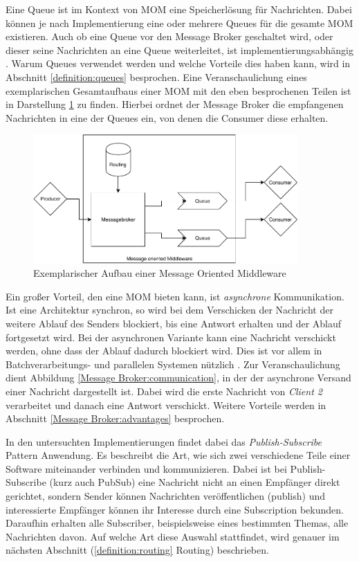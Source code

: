 Eine Queue ist im Kontext von MOM eine Speicherlösung für Nachrichten.
Dabei können je nach Implementierung eine oder mehrere Queues für die gesamte
MOM existieren. Auch ob eine Queue vor den
Message Broker geschaltet wird, oder dieser seine Nachrichten an eine Queue
weiterleitet, ist implementierungsabhängig \cite{KafkaClients:online,RabbitMQ:online}.
Warum Queues verwendet werden und welche Vorteile dies haben kann, wird in
Abschnitt \ref{definition:queues} besprochen.
Eine Veranschaulichung eines exemplarischen Gesamtaufbaus einer MOM mit den
eben besprochenen Teilen ist in Darstellung \ref{definition:momfigure} zu finden.
Hierbei ordnet der Message Broker die empfangenen Nachrichten in eine der Queues
ein, von denen die Consumer diese erhalten.

\begin{figure}[h]
  \centering
    \includegraphics[width=0.9\textwidth]{figures/mom.pdf}
  \caption{Exemplarischer Aufbau einer Message Oriented Middleware}
  \label{definition:momfigure}
\end{figure}

Ein großer Vorteil, den eine MOM bieten kann, ist \textit{asynchrone} Kommunikation.
Ist eine Architektur synchron, so wird bei dem Verschicken der
Nachricht der weitere Ablauf des Senders blockiert, bis eine Antwort erhalten
und der Ablauf fortgesetzt wird. Bei der asynchronen Variante kann eine
Nachricht verschickt werden, ohne dass der Ablauf dadurch blockiert wird.
Dies ist vor allem in Batchverarbeitungs- und parallelen Systemen nützlich \cite{tanenbaum2007distributed}.
Zur Veranschaulichung dient Abbildung \ref{Message Broker:communication}, in
der der asynchrone Versand einer Nachricht dargestellt ist. Dabei wird die erste
Nachricht von \textit{Client 2} verarbeitet und danach eine Antwort verschickt.
Weitere Vorteile werden in Abschnitt \ref{Message Broker:advantages} besprochen.

In den untersuchten Implementierungen findet dabei das \textit{Publish-Subscribe}
Pattern Anwendung. Es beschreibt die Art, wie sich zwei verschiedene Teile einer
Software miteinander verbinden und kommunizieren. Dabei ist bei Publish-Subscribe
(kurz auch PubSub) eine Nachricht nicht an einen Empfänger direkt gerichtet,
sondern Sender können Nachrichten veröffentlichen (publish) und interessierte
Empfänger können ihr Interesse durch eine Subscription bekunden.
Daraufhin erhalten alle Subscriber, beispielsweise eines bestimmten Themas, alle
Nachrichten davon. Auf welche Art diese Auswahl stattfindet, wird genauer im nächsten
Abschnitt (\ref{definition:routing} Routing) beschrieben. \cite{eugster2003many}

